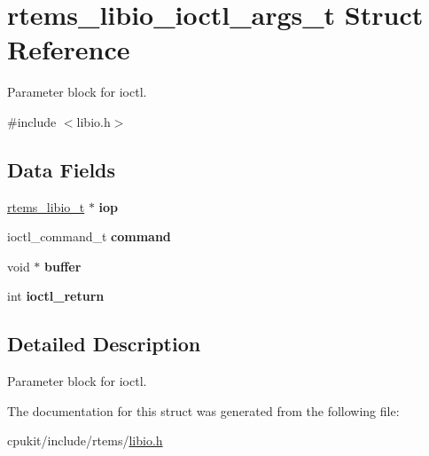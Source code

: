 \hypertarget{structrtems__libio__ioctl__args__t}{}\section{rtems\+\_\+libio\+\_\+ioctl\+\_\+args\+\_\+t Struct Reference}
\label{structrtems__libio__ioctl__args__t}


Parameter block for ioctl.  




{\ttfamily \#include $<$libio.\+h$>$}

\subsection*{Data Fields}
\begin{DoxyCompactItemize}
\item 
\mbox{\label{structrtems__libio__ioctl__args__t_a4280d3dc80cc6bc6385cab6be6393f46}} 
\mbox{\hyperlink{structrtems__libio__tt}{rtems\+\_\+libio\+\_\+t}} $\ast$ {\bfseries iop}
\item 
\mbox{\label{structrtems__libio__ioctl__args__t_abbc42d4bd49105fab12e600f5d003add}} 
ioctl\+\_\+command\+\_\+t {\bfseries command}
\item 
\mbox{\label{structrtems__libio__ioctl__args__t_a2184c746ccb73ed3e56fc466ba782d67}} 
void $\ast$ {\bfseries buffer}
\item 
\mbox{\label{structrtems__libio__ioctl__args__t_aa92aee8cf03cd07ef28711505e8ba3df}} 
int {\bfseries ioctl\+\_\+return}
\end{DoxyCompactItemize}


\subsection{Detailed Description}
Parameter block for ioctl. 

The documentation for this struct was generated from the following file\+:\begin{DoxyCompactItemize}
\item 
cpukit/include/rtems/\mbox{\hyperlink{libio_8h}{libio.\+h}}\end{DoxyCompactItemize}
